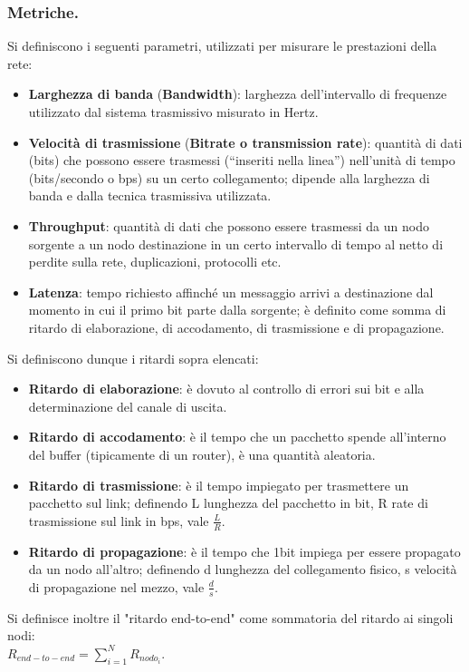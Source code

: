 \documentclass[11pt, italian, openany]{book}
\begin{document}
\begin{sloppypar}
\subsubsection*{Metriche.}
Si definiscono i seguenti parametri, utilizzati per misurare le prestazioni della rete:
\begin{itemize}[topsep=0pt]
	\itemsep-0.3em
	\item \textbf{Larghezza di banda} (\textbf{Bandwidth}): larghezza dell’intervallo di frequenze utilizzato dal sistema trasmissivo misurato in Hertz.
	\item \textbf{Velocit\`a di trasmissione} (\textbf{Bitrate o transmission rate}): quantit\`a di dati (bits) che possono essere trasmessi (“inseriti
	nella linea”) nell'unit\`a di tempo (bits/secondo o bps) su un certo collegamento; dipende alla larghezza di banda e dalla tecnica trasmissiva
	utilizzata.
	\item \textbf{Throughput}: quantit\`a di dati che possono essere trasmessi da un nodo sorgente a un nodo destinazione in un certo intervallo di tempo
	al netto di perdite sulla rete, duplicazioni, protocolli etc.
	\item \textbf{Latenza}: tempo richiesto affinch\'e un messaggio arrivi a destinazione dal momento in cui il primo bit parte dalla sorgente; \`e
	definito come somma di ritardo di elaborazione, di accodamento, di trasmissione e di propagazione.
\end{itemize}
Si definiscono dunque i ritardi sopra elencati:
\begin{itemize}[topsep=0pt]
	\itemsep-0.3em
	\item \textbf{Ritardo di elaborazione}: \`e dovuto al controllo di errori sui bit e alla determinazione del canale di uscita.
	\item \textbf{Ritardo di accodamento}: \`e il tempo che un pacchetto spende all'interno del buffer (tipicamente di un router), \`e una
	quantit\`a aleatoria.
	\item \textbf{Ritardo di trasmissione}: \`e il tempo impiegato per trasmettere un pacchetto sul link; definendo L lunghezza del pacchetto in bit,
	R rate di trasmissione sul link in bps, vale \( \frac{L}{R} \).
	\item \textbf{Ritardo di propagazione}: \`e il tempo che 1bit impiega per essere propagato da un nodo all'altro; definendo d lunghezza del
	collegamento fisico, s velocit\`a di propagazione nel mezzo, vale \( \frac{d}{s} \).
\end{itemize}
Si definisce inoltre il "ritardo end-to-end" come sommatoria del ritardo ai singoli nodi: \\\( R_{end-to-end} = \sum_{i=1}^{N} R_{nodo_i}\).


\end{sloppypar}
\end{document}
